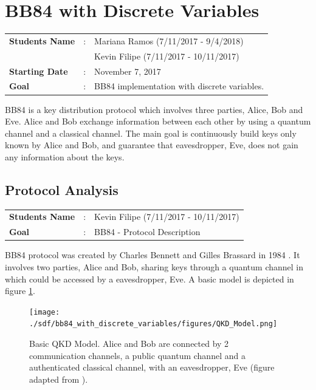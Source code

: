 \clearpage
\section{BB84 with Discrete Variables}

\begin{refsection}

\begin{tcolorbox}	
\begin{tabular}{p{2.75cm} p{0.2cm} p{10.5cm}} 	
\textbf{Students Name}  &:& Mariana Ramos (7/11/2017 - 9/4/2018) \\
                        & & Kevin Filipe (7/11/2017 - 10/11/2017) \\
\textbf{Starting Date} &:& November 7, 2017\\
\textbf{Goal}          &:& BB84 implementation with discrete variables.
\end{tabular}
\end{tcolorbox}

BB84 is a key distribution protocol which involves three parties, Alice, Bob and Eve. Alice and Bob exchange information between each other by using a quantum channel and a classical channel. The main goal is continuously build keys only known by Alice and Bob, and guarantee that eavesdropper, Eve, does not gain any information about the keys.


\subsection{Protocol Analysis}
\begin{tcolorbox}	
	\begin{tabular}{p{2.75cm} p{0.2cm} p{10.5cm}} 	
		\textbf{Students Name}  &:& Kevin Filipe (7/11/2017 - 10/11/2017)\\
		\textbf{Goal}          &:& BB84 - Protocol Description
	\end{tabular}
\end{tcolorbox}

BB84 protocol was created by Charles Bennett and Gilles Brassard in 1984 \cite{Bennet84}. It involves two parties, Alice and Bob, sharing keys through a quantum channel in which could be accessed by a eavesdropper, Eve. A basic model is depicted in figure \ref{fig:qkd model}.

\begin{figure}[H]
	\centering
	\texttt{[image: ./sdf/bb84\_with\_discrete\_variables/figures/QKD\_Model.png]}
	\caption{Basic QKD Model. Alice and Bob are connected by 2 communication channels, a public quantum channel and a authenticated classical channel, with an eavesdropper, Eve (figure adapted from \cite{Gerry05}).}\label{fig:qkd model}
\end{figure}


\end{refsection}
